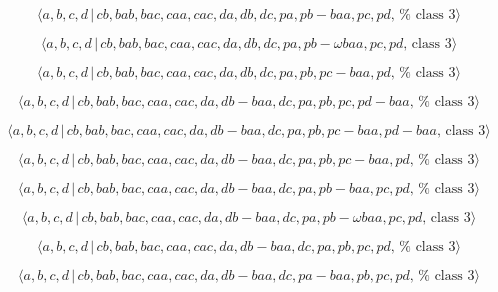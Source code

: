 \documentclass[10pt]{article}
\begin{document}
\begin{equation}
\langle a,b,c,d\,|\,cb,bab,bac,caa,cac,da,db,dc,pa,pb-baa,pc,pd,\,\text{%
class }3\rangle  \tag{7.3807}
\end{equation}

\begin{equation}
\langle a,b,c,d\,|\,cb,bab,bac,caa,cac,da,db,dc,pa,pb-\omega baa,pc,pd,\,%
\text{class }3\rangle  \tag{7.3808}
\end{equation}

\begin{equation}
\langle a,b,c,d\,|\,cb,bab,bac,caa,cac,da,db,dc,pa,pb,pc-baa,pd,\,\text{%
class }3\rangle  \tag{7.3809}
\end{equation}

\begin{equation}
\langle a,b,c,d\,|\,cb,bab,bac,caa,cac,da,db-baa,dc,pa,pb,pc,pd-baa,\,\text{%
class }3\rangle  \tag{7.3810}
\end{equation}

\begin{equation}
\langle a,b,c,d\,|\,cb,bab,bac,caa,cac,da,db-baa,dc,pa,pb,pc-baa,pd-baa,\,%
\text{class }3\rangle  \tag{7.3811}
\end{equation}

\begin{equation}
\langle a,b,c,d\,|\,cb,bab,bac,caa,cac,da,db-baa,dc,pa,pb,pc-baa,pd,\,\text{%
class }3\rangle  \tag{7.3812}
\end{equation}

\begin{equation}
\langle a,b,c,d\,|\,cb,bab,bac,caa,cac,da,db-baa,dc,pa,pb-baa,pc,pd,\,\text{%
class }3\rangle  \tag{7.3813}
\end{equation}

\begin{equation}
\langle a,b,c,d\,|\,cb,bab,bac,caa,cac,da,db-baa,dc,pa,pb-\omega baa,pc,pd,\,%
\text{class }3\rangle  \tag{7.3814}
\end{equation}

\begin{equation}
\langle a,b,c,d\,|\,cb,bab,bac,caa,cac,da,db-baa,dc,pa,pb,pc,pd,\,\text{%
class }3\rangle  \tag{7.3815}
\end{equation}

\begin{equation}
\langle a,b,c,d\,|\,cb,bab,bac,caa,cac,da,db-baa,dc,pa-baa,pb,pc,pd,\,\text{%
class }3\rangle  \tag{7.3816}
\end{equation}
\end{document}
